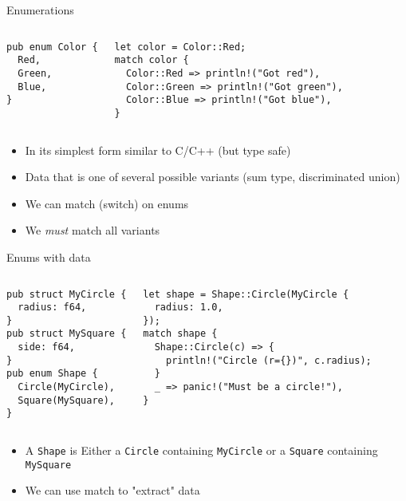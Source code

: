 \begin{frame}[fragile]{Enumerations}
\begin{columns}[t,onlytextwidth]
\begin{verbatim}
pub enum Color {
  Red,
  Green,
  Blue,
}
\end{verbatim}
\begin{verbatim}
let color = Color::Red;
match color {
  Color::Red => println!("Got red"),
  Color::Green => println!("Got green"),
  Color::Blue => println!("Got blue"),
}
\end{verbatim}
\end{columns}
  \begin{itemize}
    \item<1-> In its simplest form similar to C/C++ (but type safe)
    \item<1-> Data that is one of several possible variants (sum type, discriminated union)
    \item<2> We can match (switch) on enums
    \item<2> We \emph{must} match all variants
  \end{itemize}
\end{frame}

\begin{frame}[fragile]{Enums with data}
\begin{columns}[t,onlytextwidth]
\begin{verbatim}
pub struct MyCircle {
  radius: f64,
}
pub struct MySquare {
  side: f64,
}
pub enum Shape {
  Circle(MyCircle),
  Square(MySquare),
}
\end{verbatim}
\pause\begin{verbatim}
let shape = Shape::Circle(MyCircle {
  radius: 1.0,
});
match shape {
  Shape::Circle(c) => {
    println!("Circle (r={})", c.radius);
  }
  _ => panic!("Must be a circle!"),
}
\end{verbatim}
\end{columns}
\begin{itemize}
  \item<1-> A \texttt{Shape} is Either a \texttt{Circle} containing
    \texttt{MyCircle} or a
    \texttt{Square} containing \texttt{MySquare}
  \item<2-> We can use match to "extract" data
\end{itemize}
\end{frame}



